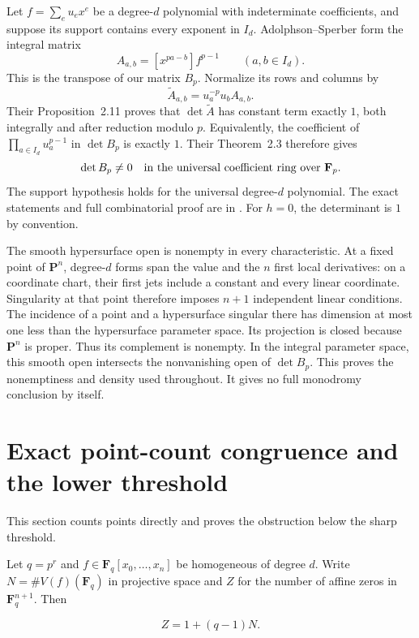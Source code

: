 \documentclass[11pt]{article}
\begin{document}
Let $f=\sum_e u_e x^e$ be a degree-$d$ polynomial with indeterminate coefficients, and suppose its support contains every exponent in $I_d$. Adolphson--Sperber form the integral matrix
\[
A_{a,b}=[x^{pa-b}]f^{p-1}\qquad(a,b\in I_d).
\]
This is the transpose of our matrix $B_p$. Normalize its rows and columns by
\[
\widetilde A_{a,b}=u_a^{-p}u_b A_{a,b}.
\]
Their Proposition~2.11 proves that $\det\widetilde A$ has constant term exactly $1$, both integrally and after reduction modulo $p$. Equivalently, the coefficient of $\prod_{a\in I_d}u_a^{p-1}$ in $\det B_p$ is exactly $1$. Their Theorem~2.3 therefore gives
\[
\det B_p\ne0\quad\hbox{in the universal coefficient ring over }\mathbf F_p.
\]
The support hypothesis holds for the universal degree-$d$ polynomial. The exact statements and full combinatorial proof are in \citet[Section~2, pp.~2--4 of the arXiv version]{AdolphsonSperber}. For $h=0$, the determinant is $1$ by convention.

The smooth hypersurface open is nonempty in every characteristic. At a fixed point of $\mathbf P^n$, degree-$d$ forms span the value and the $n$ first local derivatives: on a coordinate chart, their first jets include a constant and every linear coordinate. Singularity at that point therefore imposes $n+1$ independent linear conditions. The incidence of a point and a hypersurface singular there has dimension at most one less than the hypersurface parameter space. Its projection is closed because $\mathbf P^n$ is proper. Thus its complement is nonempty. In the integral parameter space, this smooth open intersects the nonvanishing open of $\det B_p$. This proves the nonemptiness and density used throughout. It gives no full monodromy conclusion by itself.

\section{Exact point-count congruence and the lower threshold}\label{sec:pn-4}

This section counts points directly and proves the obstruction below the sharp threshold.

Let \(q=p^r\) and \(f\in\mathbf F_q[x_0,\ldots,x_n]\) be homogeneous of
degree \(d\). Write \(N=\#V(f)(\mathbf F_q)\) in projective space and
\(Z\) for the number of affine zeros in \(\mathbf F_q^{n+1}\). Then

\begin{equation}
                     Z=1+(q-1)N.                                     \label{eq:pn-4-1}
\end{equation}
\end{document}
